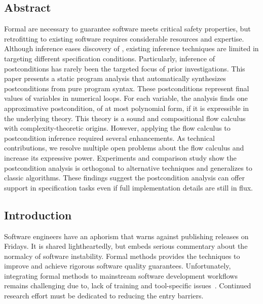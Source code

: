 \subsection*{Abstract}

Formal  are necessary to guarantee software meets critical safety
properties, but retrofitting  to existing software requires
considerable resources and expertise. Although inference eases discovery of
, existing inference techniques are limited in targeting different
specification conditions. Particularly, inference of postconditions has rarely
been the targeted focus of prior investigations. This paper presents a static
program analysis that automatically synthesizes postconditions from pure program
syntax. These postconditions represent final values of variables in numerical
loops. For each variable, the analysis finds one approximative postcondition, of
at most polynomial form, if it is expressible in the underlying theory. This
theory is a sound and compositional flow calculus with complexity-theoretic
origins. However, applying the flow calculus to postcondition inference required
several enhancements. As technical contributions, we resolve multiple open
problems about the flow calculus and increase its expressive power. Experiments
and comparison study show the postcondition analysis is orthogonal to
alternative techniques and generalizes to classic algorithms. These findings
suggest the postcondition analysis can offer support in specification tasks even
if full implementation details are still in flux.

\subsection{Introduction}
\label{sec:pc-intro}

Software engineers have an aphorism that warns against publishing releases on
Fridays. It is shared lightheartedly, but embeds serious commentary about the
normalcy of software instability. Formal methods provides the techniques to
improve and achieve rigorous software quality guarantees. Unfortunately,
integrating formal methods to mainstream software development workflows remains
challenging due to, \eg lack of training and tool-specific
issues~\cite{beek2024}. Continued research effort must be dedicated to reducing
the entry barriers.

